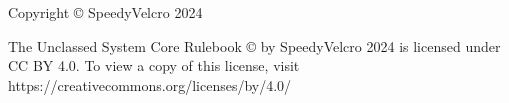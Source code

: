 
\vspace*{\fill}

\begin{center}
    Copyright © SpeedyVelcro 2024
 
    \vspace{1in}

    The Unclassed System Core Rulebook © by SpeedyVelcro 2024 is licensed under
    CC BY 4.0. To view a copy of this license, visit
    https://creativecommons.org/licenses/by/4.0/
\end{center}

\vspace*{\fill}

